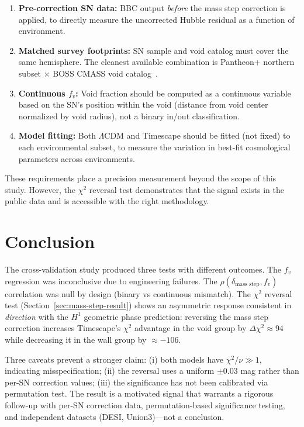 \documentclass[11pt]{article}
\begin{document}
\begin{enumerate}
  \item \textbf{Pre-correction SN data:} BBC output \emph{before}
    the mass step correction is applied, to directly measure the
    uncorrected Hubble residual as a function of environment.
  \item \textbf{Matched survey footprints:} SN sample and void
    catalog must cover the same hemisphere. The cleanest available
    combination is Pantheon+ northern subset $\times$
    BOSS CMASS void catalog~\cite{BOSS}.
  \item \textbf{Continuous $f_v$:} Void fraction should be computed
    as a continuous variable based on the SN's position within the
    void (distance from void center normalized by void radius),
    not a binary in/out classification.
  \item \textbf{Model fitting:} Both $\Lambda$CDM and Timescape
    should be fitted (not fixed) to each environmental subset, to
    measure the variation in best-fit cosmological parameters across
    environments.
\end{enumerate}

These requirements place a precision measurement beyond the scope of
this study. However, the $\chi^2$ reversal test demonstrates that the
signal exists in the public data and is accessible with the right
methodology.

\section{Conclusion}
\label{sec:conclusion}

The cross-validation study produced three tests with different
outcomes. The $f_v$ regression was inconclusive due to engineering
failures. The $\rho(\delta_{\text{mass step}}, f_v)$ correlation
was null by design (binary vs continuous mismatch). The
$\chi^2$ reversal test (Section~\ref{sec:mass-step-result})
shows an asymmetric response consistent in \emph{direction} with
the $H^1$ geometric phase prediction: reversing the mass step
correction increases Timescape's $\chi^2$ advantage in the void
group by $\Delta\chi^2 \approx 94$ while decreasing it in the
wall group by $\approx -106$.

Three caveats prevent a stronger claim: (i) both models have
$\chi^2/\nu \gg 1$, indicating misspecification; (ii) the
reversal uses a uniform $\pm 0.03$ mag rather than per-SN
correction values; (iii) the significance has not been calibrated
via permutation test. The result is a motivated signal that
warrants a rigorous follow-up with per-SN correction data,
permutation-based significance testing, and independent datasets
(DESI, Union3)---not a conclusion.
\end{document}
